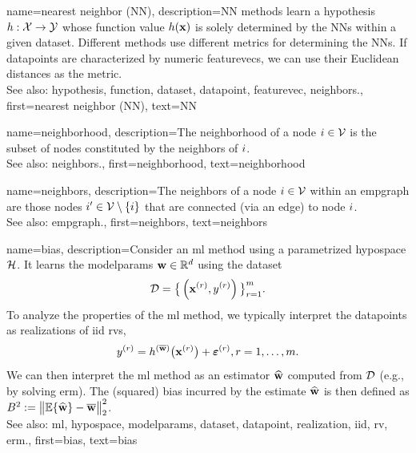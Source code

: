 {name={nearest neighbor (NN)},
	description={NN methods learn a \gls{hypothesis} 
		$h: \mathcal{X} \rightarrow \mathcal{Y}$ whose \gls{function} value $h({\bf x})$ 
		is solely determined by the NNs within a given \gls{dataset}. Different 
		methods use different metrics for determining the NNs. If \glspl{datapoint} 
		are characterized by numeric \glspl{featurevec}, we can use their Euclidean distances as 
		the metric.
					\\ 
		See also: \gls{hypothesis}, \gls{function}, \gls{dataset}, \gls{datapoint}, \gls{featurevec}, \gls{neighbors}.},
	first={nearest neighbor (NN)},
	text={NN} 
}

{name={neighborhood},
	description={The neighborhood of a node $i \in \mathcal{V}$ is 
		the subset of nodes constituted by the \gls{neighbors} of $i$.
				\\ 
		See also: \gls{neighbors}.},
	first={neighborhood},
	text={neighborhood} 
}


{name={neighbors},
	description={The neighbors of a node $i \in \mathcal{V}$ 
		within an \gls{empgraph} are those nodes $i' \in \mathcal{V} \setminus \{ i\}$ that are connected (via an edge) to node $i$.
				\\ 
		See also: \gls{empgraph}.},
	first={neighbors},
	text={neighbors} 
}

{name={bias},
	description={Consider an \gls{ml} method using a parametrized \gls{hypospace} $\mathcal{H}$. 
		It learns the \gls{modelparams} ${\bf w} \in \mathbb{R}^{d}$ using the \gls{dataset} $$ \mathcal{D}=\big\{ \left( {\bf x}^{(r)},y^{(r)} \right) \big\}_{r=1}^{m}.$$ 
		To analyze the properties of the \gls{ml} method, we typically interpret the \glspl{datapoint} as \glspl{realization} 
		of \gls{iid} \glspl{rv}, $$ y^{(r)} = h^{(\overline{{\bf w}})}\big( {\bf x}^{(r)} \big) + \bm{\varepsilon}^{(r)}, r=1,\ldots,m.$$ 
		We can then interpret the \gls{ml} method as an estimator $\widehat{{\bf w}}$ 
		computed from $\mathcal{D}$ (e.g., by solving \gls{erm}). The (squared) bias incurred by the estimate $\widehat{{\bf w}}$ 
		is then defined as $B^{2} := \big\| \mathbb{E} \{ \widehat{{\bf w}}  \}- \overline{{\bf w}}\big\|_{2}^{2}$.
					\\ 
		See also: \gls{ml}, \gls{hypospace}, \gls{modelparams}, \gls{dataset}, \gls{datapoint}, \gls{realization}, \gls{iid}, \gls{rv}, \gls{erm}.},
	first={bias},
	text={bias} 
}

